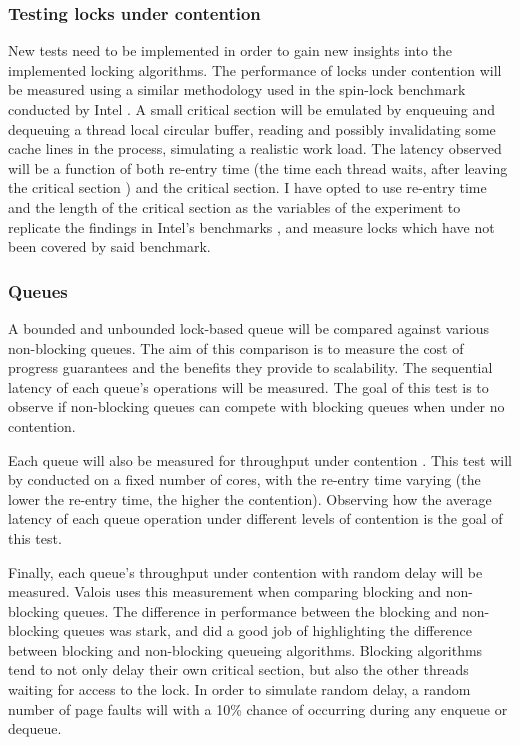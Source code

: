 \documentclass[a4paper, 12pt, titlepage]{article}
\begin{document}
\begin{singlespace}
\subsubsection{Testing locks under contention}
New tests need to be implemented in order to gain new insights into the implemented locking algorithms. The performance of locks under contention will be measured using a similar methodology used in the spin-lock benchmark conducted by Intel \cite{intelxeonlockscaling}. A small critical section will be emulated by enqueuing and dequeuing a thread local circular buffer, reading and possibly invalidating some cache lines in the process, simulating a realistic work load. The latency observed will be a function of both re-entry time (the time each thread waits, after leaving the critical section \cite{intelxeonlockscaling}) and the critical section. I have opted to use re-entry time and the length of the critical section as the variables of the experiment to replicate the findings in Intel's benchmarks \cite{intelxeonlockscaling}, and measure locks which have not been covered by said benchmark.

\subsubsection{Queues}
A bounded and unbounded lock-based queue \cite[Section~10.2]{herlihy2020art} will be compared against various non-blocking queues. The aim of this comparison is to measure the cost of progress guarantees\cite{herlihy2020art, mckenney2017parallel} and the benefits they provide to scalability. The sequential latency of each queue's operations will be measured. The goal of this test is to observe if non-blocking queues can compete with blocking queues when under no contention.

Each queue will also be measured for throughput under contention \cite{valois1995lock,michael1996simple,kogan2011wait}. This test will by conducted on a fixed number of cores, with the re-entry time varying (the lower the re-entry time, the higher the contention). Observing how the average latency of each queue operation under different levels of contention is the goal of this test.

Finally, each queue's throughput under contention with random delay will be measured. Valois uses this measurement \cite{valois1995lock} when comparing blocking and non-blocking queues. The difference in performance between the blocking and non-blocking queues was stark, and did a good job of highlighting the difference between blocking and non-blocking queueing algorithms. Blocking algorithms tend to not only delay their own critical section, but also the other threads waiting for access to the lock. In order to simulate random delay, a random number of page faults will with a 10\% chance of occurring during any enqueue or dequeue.


\end{singlespace}
\end{document}
